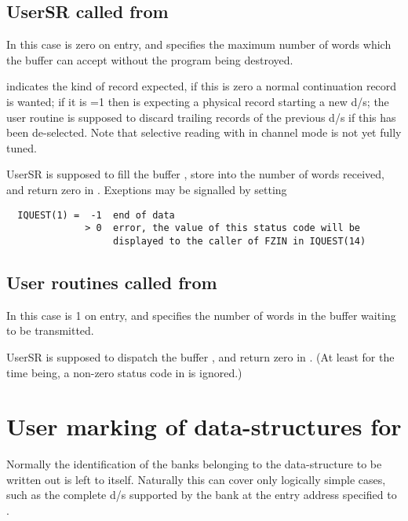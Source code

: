 \subsection*{UserSR called from }

In this case  is zero on entry, and  specifies
the maximum number of words which the buffer  can accept
without the program being destroyed.

 indicates the kind of record expected,
if this is zero a normal continuation record is wanted;
if it is =1 then  is expecting a physical record
starting a new d/s;
the user routine is supposed to discard trailing records
of the previous d/s if this has been de-selected.
Note that selective reading with  in channel mode
is not yet fully tuned.

UserSR is supposed to fill the buffer ,
store into  the number of words received,
and return zero in .
Exeptions may be signalled by setting
\begin{verbatim}
  IQUEST(1) =  -1  end of data
              > 0  error, the value of this status code will be
                   displayed to the caller of FZIN in IQUEST(14)
\end{verbatim}

\subsection*{User routines called from }

In this case  is 1 on entry, and  specifies
the number of words in the buffer  waiting to be transmitted.

UserSR is supposed to dispatch the buffer ,
and return zero in .
(At least for the time being, a non-zero status code in 
is ignored.)

\section{User marking of data-structures for \protect{}}
\label{sec:FZmarking}

Normally the identification of the banks belonging to the
data-structure to be written out is left to  itself.
Naturally this can cover only logically simple cases,
such as the complete d/s supported by the bank at the
entry address specified to .

